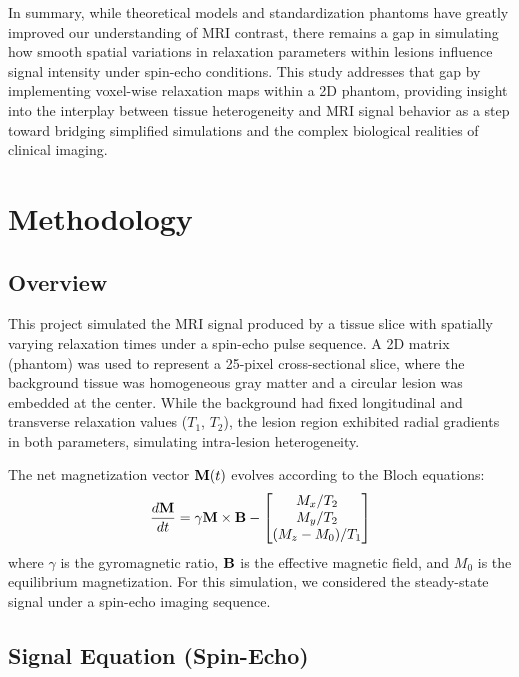 \documentclass[10pt,a4paper,twoside]{article}
\begin{document}
In summary, while theoretical models and standardization phantoms have greatly improved our understanding of MRI contrast, there remains a gap in simulating how smooth spatial variations in relaxation parameters within lesions influence signal intensity under spin-echo conditions. This study addresses that gap by implementing voxel-wise relaxation maps within a 2D phantom, providing insight into the interplay between tissue heterogeneity and MRI signal behavior as a step toward bridging simplified simulations and the complex biological realities of clinical imaging.

\section{Methodology}\label{sec:methods}

\subsection{Overview}

This project simulated the MRI signal produced by a tissue slice with spatially varying relaxation times under a spin-echo pulse sequence. A 2D matrix (phantom) was used to represent a 25-pixel cross-sectional slice, where the background tissue was homogeneous gray matter and a circular lesion was embedded at the center. While the background had fixed longitudinal and transverse relaxation values ($T_1$, $T_2$), the lesion region exhibited radial gradients in both parameters, simulating intra-lesion heterogeneity.

The net magnetization vector $\vb{M}(t)$ evolves according to the Bloch equations:
\begin{align}
\frac{d\vb{M}}{dt} = \gamma \vb{M} \times \vb{B} - 
\begin{bmatrix}
    M_x / T_2 \\
    M_y / T_2 \\
    (M_z - M_0)/ T_1
\end{bmatrix}
\end{align}
where $ \gamma $ is the gyromagnetic ratio, $ \vb{B} $ is the effective magnetic field, and $ M_0 $ is the equilibrium magnetization. For this simulation, we considered the steady-state signal under a spin-echo imaging sequence.

\subsection{Signal Equation (Spin-Echo)}
\end{document}

